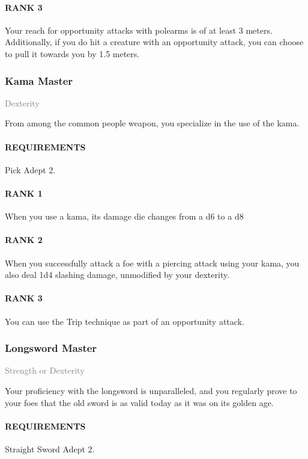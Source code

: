 \paragraph{RANK 3} Your reach for opportunity attacks with polearms is of at least 3 meters.
Additionally, if you do hit a creature with an opportunity attack, you can choose to pull it towards you by 1.5 meters.

\subsubsection{Kama Master} \label{feat::kamamaster}
\small{\textcolor{gray}{Dexterity}}

\normalsize
From among the common people weapon, you specialize in the use of the kama.
\paragraph{REQUIREMENTS} Pick Adept 2.
\paragraph{RANK 1} When you use a kama, its damage die changes from a d6 to a d8
\paragraph{RANK 2} When you successfully attack a foe with a piercing attack using your kama, you also deal 1d4 slashing damage, unmodified by your dexterity.
\paragraph{RANK 3} You can use the Trip technique as part of an opportunity attack.

\subsubsection{Longsword Master} \label{feat::longswordmaster}
\small{\textcolor{gray}{Strength or Dexterity}}

\normalsize
Your proficiency with the longsword is unparalleled, and you regularly prove to your foes that the old sword is as valid today as it was on its golden age.
\paragraph{REQUIREMENTS} Straight Sword Adept 2.
